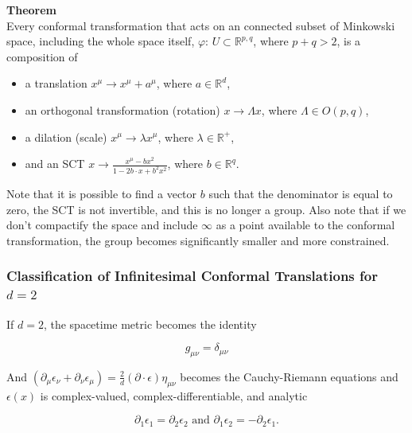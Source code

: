 \documentclass[10pt]{article}
\begin{document}
\noindent \textbf{Theorem} \\

\noindent Every conformal transformation that acts on an connected subset of Minkowski space, including the whole space itself, $\varphi : \, U \subset \mathbb{R}^{p,q}$, where $p+q > 2$, is a composition of 

\begin{itemize}
\item a translation
	\subitem $x^\mu \rightarrow x^\mu + a^\mu$, where $a \in \mathbb{R}^d$,
\item an orthogonal transformation (rotation)
	\subitem $x \rightarrow \Lambda x$, where $\Lambda \in O(p,q)$,
\item a dilation (scale)
	\subitem $x^\mu \rightarrow \lambda x^\mu$, where $\lambda \in \mathbb{R}^+$,
\item and an SCT
	\subitem $x \rightarrow \frac{x^\mu - b x^2 }{1-2b \cdot x + b^2 x^2}$, where $b \in \mathbb{R}^q$.
\end{itemize}

\noindent Note that it is possible to find a vector $b$ such that the denominator is equal to zero, the SCT is not invertible, and this is no longer a group. Also note that if we don't compactify the space and include $\infty$ as a point available to the conformal transformation, the group becomes significantly smaller and more constrained. \\

\subsubsection*{Classification of Infinitesimal Conformal Translations for $d=2$}

\noindent If $d=2$, the spacetime metric becomes the identity

\begin{equation}
g_{\mu\nu} = \delta_{\mu\nu}
\end{equation}

\noindent And $(\partial_\mu \epsilon_\nu + \partial_\nu \epsilon_\mu) = \frac{2}{d} (\partial \cdot \epsilon) \eta_{\mu\nu}$ becomes the Cauchy-Riemann equations and $\epsilon(x)$ is complex-valued, complex-differentiable, and analytic

\begin{equation}
\partial_1 \epsilon_1 = \partial_2 \epsilon_2 \text{ and } \partial_1 \epsilon_2 = - \partial_2 \epsilon_1.
\end{equation}
\end{document}
